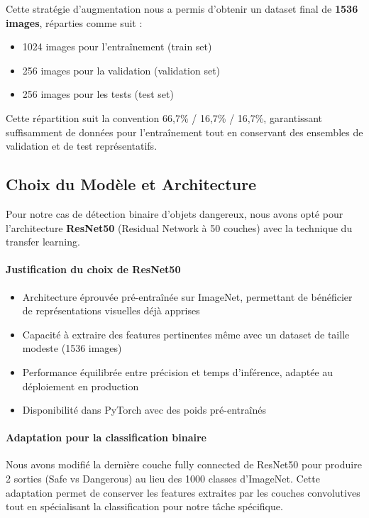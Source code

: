 Cette stratégie d'augmentation nous a permis d'obtenir un dataset final de \textbf{1536 images}, réparties comme suit :
\begin{itemize}
    \item 1024 images pour l'entraînement (train set)
    \item 256 images pour la validation (validation set)
    \item 256 images pour les tests (test set)
\end{itemize}

Cette répartition suit la convention 66,7\% / 16,7\% / 16,7\%, garantissant suffisamment de données pour l'entraînement tout en conservant des ensembles de validation et de test représentatifs.

\subsection{Choix du Modèle et Architecture}

Pour notre cas de détection binaire d'objets dangereux, nous avons opté pour l'architecture \textbf{ResNet50} (Residual Network à 50 couches) avec la technique du transfer learning.

\paragraph{Justification du choix de ResNet50}
\begin{itemize}
    \item Architecture éprouvée pré-entraînée sur ImageNet, permettant de bénéficier de représentations visuelles déjà apprises
    \item Capacité à extraire des features pertinentes même avec un dataset de taille modeste (1536 images)
    \item Performance équilibrée entre précision et temps d'inférence, adaptée au déploiement en production
    \item Disponibilité dans PyTorch avec des poids pré-entraînés
\end{itemize}

\paragraph{Adaptation pour la classification binaire}
Nous avons modifié la dernière couche fully connected de ResNet50 pour produire 2 sorties (Safe vs Dangerous) au lieu des 1000 classes d'ImageNet. Cette adaptation permet de conserver les features extraites par les couches convolutives tout en spécialisant la classification pour notre tâche spécifique.

